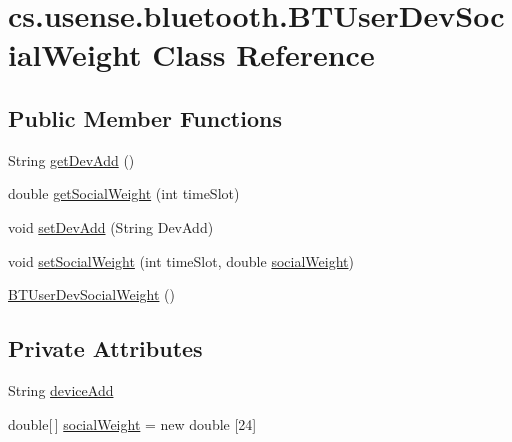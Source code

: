 \hypertarget{classcs_1_1usense_1_1bluetooth_1_1_b_t_user_dev_social_weight}{}\section{cs.\+usense.\+bluetooth.\+B\+T\+User\+Dev\+Social\+Weight Class Reference}
\label{classcs_1_1usense_1_1bluetooth_1_1_b_t_user_dev_social_weight}
\subsection*{Public Member Functions}
\begin{DoxyCompactItemize}
\item 
String \hyperlink{classcs_1_1usense_1_1bluetooth_1_1_b_t_user_dev_social_weight_a32e1f4acb0cc6287e5c353df2d46e4b3}{get\+Dev\+Add} ()
\item 
double \hyperlink{classcs_1_1usense_1_1bluetooth_1_1_b_t_user_dev_social_weight_a2b5c47645534b20de17fd5616ce932fb}{get\+Social\+Weight} (int time\+Slot)
\item 
void \hyperlink{classcs_1_1usense_1_1bluetooth_1_1_b_t_user_dev_social_weight_a84e34695528878b65bf585f143a986d6}{set\+Dev\+Add} (String Dev\+Add)
\item 
void \hyperlink{classcs_1_1usense_1_1bluetooth_1_1_b_t_user_dev_social_weight_a25c3a5092066dce0996bfa5b006d9b6c}{set\+Social\+Weight} (int time\+Slot, double \hyperlink{classcs_1_1usense_1_1bluetooth_1_1_bluetooth_core_1_1social_weight}{social\+Weight})
\item 
\hyperlink{classcs_1_1usense_1_1bluetooth_1_1_b_t_user_dev_social_weight_a8f6a5bc649a6129aa8b936873f0290d0}{B\+T\+User\+Dev\+Social\+Weight} ()
\end{DoxyCompactItemize}
\subsection*{Private Attributes}
\begin{DoxyCompactItemize}
\item 
String \hyperlink{classcs_1_1usense_1_1bluetooth_1_1_b_t_user_dev_social_weight_a59a30a9bd750dafcdcb1eeeb562cb852}{device\+Add}
\item 
double\mbox{[}$\,$\mbox{]} \hyperlink{classcs_1_1usense_1_1bluetooth_1_1_b_t_user_dev_social_weight_a2a5ca3be8acdc4df6aed63db79524f78}{social\+Weight} = new double \mbox{[}24\mbox{]}
\end{DoxyCompactItemize}


